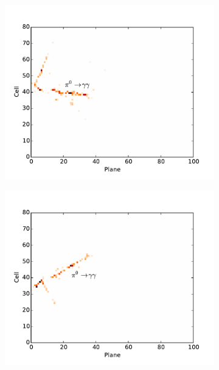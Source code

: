 \begin{figure}
\begin{center}
\vspace{-40pt}
\begin{subfigure}[c]{0.7\textwidth}
\includegraphics[width=\textwidth]{figures/cnn/view_truetype13_caltype6_event144_x.pdf}
\vspace{-20pt}
\caption*{\xview}
\end{subfigure}
\begin{subfigure}[c]{0.7\textwidth}
\includegraphics[width=\textwidth]{figures/cnn/view_truetype13_caltype6_event144_y.pdf}

\end{subfigure}
\end{center}
\end{figure}
